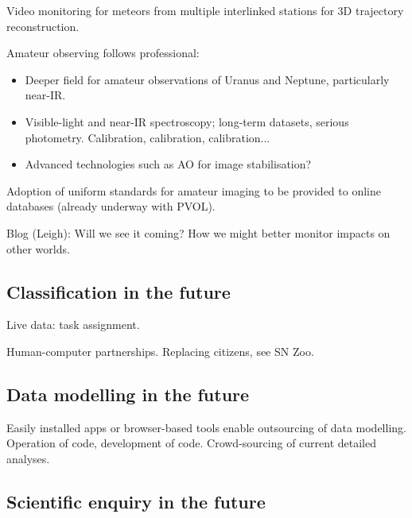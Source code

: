 \documentclass{ar2e}
\begin{document}
Video monitoring for meteors from multiple interlinked stations for 3D
trajectory reconstruction.

Amateur observing follows professional:
\begin{itemize}
\item Deeper field for amateur observations of Uranus and Neptune, particularly
near-IR.
\item Visible-light and near-IR spectroscopy; long-term datasets, serious
photometry.  Calibration, calibration, calibration...
\item Advanced technologies such as AO for image stabilisation?
\end{itemize}

Adoption of uniform standards for amateur imaging to be provided to online
databases (already underway with PVOL).


Blog (Leigh): Will we see it coming? How
we might better monitor impacts on other worlds. 



\subsection{Classification in the future}
\label{sec:future:class}

Live data: task assignment. 

Human-computer partnerships. Replacing citizens, see SN Zoo.



\subsection{Data modelling in the future}
\label{sec:future:models}

Easily installed apps or browser-based tools enable outsourcing of data
modelling. Operation of code, development of code. Crowd-sourcing of current
detailed analyses.



\subsection{Scientific enquiry in the future}
\label{sec:future:enquiry}
\end{document}
